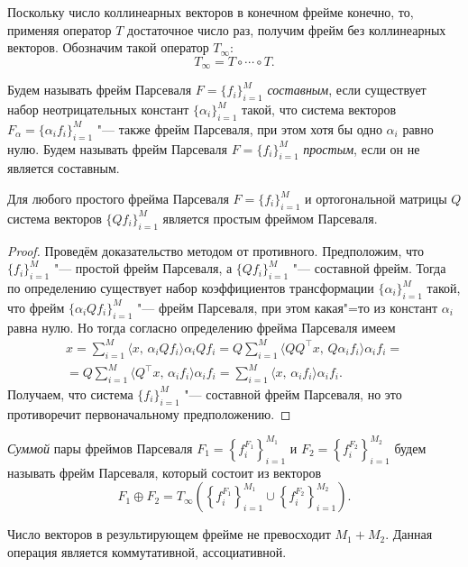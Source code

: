 \begin{definition}
Поскольку число коллинеарных векторов в конечном фрейме конечно, то, применяя оператор $T$ достаточное число раз,
получим фрейм без коллинеарных векторов. Обозначим такой оператор $T_\infty$:
$$
T_\infty = T \circ \cdots \circ T .
$$
\end{definition}

\smallskip


\begin{definition}
Будем называть фрейм Парсеваля $F = \{f_i\}_{i=1}^M$ {\it составным}, если существует набор неотрицательных констант
$\{\alpha_i\}_{i=1}^M$ такой, что система векторов
$F_\alpha = \{\alpha_i f_i\}_{i=1}^M$ "--- также фрейм Парсеваля, при этом хотя бы одно $\alpha_i$ равно нулю.
Будем называть фрейм Парсеваля $F = \{f_i\}_{i=1}^M$ {\it простым}, если он не является составным.
\end{definition}

\begin{theorem}
Для любого простого фрейма Парсеваля $F = \{f_i\}_{i=1}^M$ и ортогональной матрицы $Q$
система векторов $\{Q f_i \}_{i=1}^M$ является простым фреймом Парсеваля.
\end{theorem}

\begin{proof}
Проведём доказательство методом от противного. Предположим, что $\{f_i\}_{i=1}^M$ "--- простой фрейм Парсеваля, а $\{Q f_i\}_{i=1}^M$
"--- составной фрейм. Тогда по определению существует набор коэффициентов трансформации $\{\alpha_i\}_{i=1}^M$ такой, что
фрейм $\{\alpha_i Q f_i\}_{i=1}^M$ "--- фрейм Парсеваля, при этом какая"=то из констант $\alpha_i$ равна нулю. Но тогда согласно
определению фрейма Парсеваля имеем
\begin{multline*}
x = \sum_{i=1}^M  \langle  x,\, \alpha_i Q f_i \rangle \alpha_i Q f_i =
Q \sum_{i=1}^M \langle  Q Q^{\top} x,\, Q \alpha_i f_i \rangle \alpha_i f_i =\\ =
Q \sum_{i=1}^M \langle  Q^{\top} x,\, \alpha_i f_i \rangle \alpha_i f_i =
\sum_{i=1}^M \langle  x,\, \alpha_i f_i \rangle \alpha_i f_i.
\end{multline*}
Получаем, что система $\{f_i \}_{i=1}^M$ "--- составной фрейм Парсеваля, но это противоречит первоначальному предположению.
\end{proof}

\begin{definition}
{\it Суммой} пары фреймов Парсеваля $F_1 = \left\{f_i^{F_1}\right\}_{i=1}^{M_1}$ и $F_2 = \left\{f_i^{F_2}\right\}_{i=1}^{M_2}$ будем называть
фрейм Парсеваля, который состоит из векторов
$$
F_1 \oplus F_2 = T_\infty \left(\left\{ f_i^{F_1} \right\}_{i=1}^{M_1} \cup \left\{f_i^{F_2}\right\}_{i=1}^{M_2} \right).
$$

Число векторов в результирующем фрейме не превосходит $M_1 + M_2$.
Данная операция является коммутативной, ассоциативной.
\end{definition}

